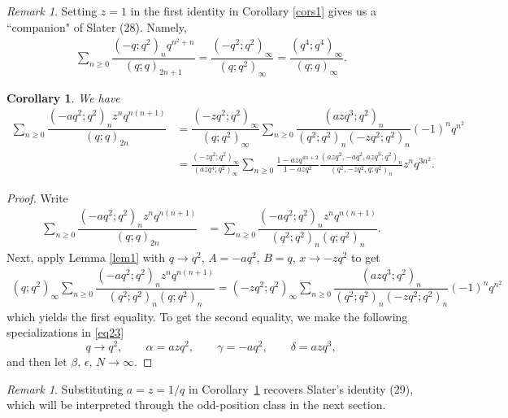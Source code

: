 \documentclass[11pt]{amsart}
\newtheorem{cor}[theorem]{Corollary}
\theoremstyle{definition}
\theoremstyle{remark}
\newtheorem{remark}[theorem]{Remark}
\numberwithin{equation}{section}
\begin{document}
\begin{remark}
Setting $z=1$ in the first identity in Corollary \ref{cors1} gives us a ``companion" of Slater (28). Namely,
\begin{align}\label{slater28comp}
\sum_{n\ge 0}\dfrac{(-q;q^2)_nq^{n^2+n}}{(q;q)_{2n+1}}=\dfrac{(-q^2;q^2)_\infty}{(q;q^2)_\infty}=\dfrac{(q^4;q^4)_\infty}{(q;q)_\infty}.
\end{align}
\end{remark}

\begin{cor}\label{cornew}
We have
\begin{equation}
\begin{split}
 \sum_{n\ge 0}\dfrac{(-aq^2;q^2)_n z^nq^{n(n+1)}}{(q;q)_{2n}}&=\dfrac{(-zq^2;q^2)_\infty}{(q;q^2)_\infty}\sum_{n\ge 0} \dfrac{(azq^3;q^2)_n}{(q^2;q^2)_n(-zq^2;q^2)_n}(-1)^n q^{n^2}\\
&=
\frac{(-zq^2;q^2)_\infty}{(azq^4;q^2)_\infty}
\sum_{n\ge 0}
\frac{1-azq^{4n+2}}{1-azq^2}
\frac{(azq^2,-aq^2,azq^3;q^2)_n}
{(q^2,-zq^2,q;q^2)_n}
z^nq^{3n^2}.
\end{split}
\end{equation}
\end{cor}
\begin{proof}
Write
\begin{align*}
\sum_{n\ge 0}\dfrac{(-aq^2;q^2)_n z^nq^{n(n+1)}}{(q;q)_{2n}}&=\sum_{n\ge 0}\dfrac{(-aq^2;q^2)_n z^nq^{n(n+1)}}{(q^2;q^2)_{n}(q;q^2)_n}.
\end{align*}
Next, apply Lemma \ref{lem1} with $q\to q^2$, $A=-aq^2$, $B=q$, $x\to -zq^2$ to get
\begin{align*}
(q;q^2)_\infty\sum_{n\ge 0}\dfrac{(-aq^2;q^2)_n z^nq^{n(n+1)}}{(q^2;q^2)_{n}(q;q^2)_n}=(-zq^2;q^2)_\infty\sum_{n\ge 0} \dfrac{(azq^3;q^2)_n}{(q^2;q^2)_n(-zq^2;q^2)_n}(-1)^n q^{n^2}
\end{align*}
which yields the first equality. To get the second equality, we make the following specializations in \eqref{eq23}
\begin{equation*}
q\rightarrow q^2,\qquad
\alpha=azq^2,\qquad
\gamma=-aq^2,\qquad
\delta=azq^3,
\end{equation*}
and then let $\beta,\,\epsilon,\,N\to\infty.$
\end{proof}
\begin{remark}
Substituting $a=z=1/q$ in Corollary~\ref{cornew} recovers Slater's identity (29), which will be interpreted through the odd-position class in the next section.
\end{remark}
\end{document}
